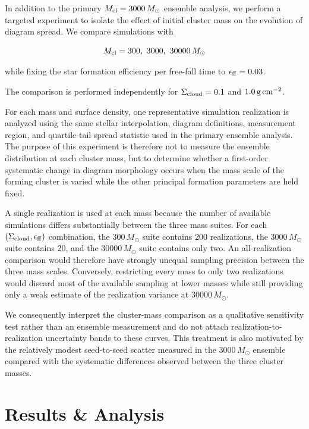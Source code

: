 \documentclass[linenumbers, twocolumn]{aastex631}
\begin{document}
In addition to the primary $M_{\rm cl}=3000\,M_\odot$ ensemble analysis, we perform a targeted experiment to isolate the effect of initial cluster mass on the evolution of diagram spread. We compare simulations with

\begin{equation}
    M_{\rm cl} = 300,\ 3000,\ 30000\,M_\odot
\end{equation}

while fixing the star formation efficiency per free-fall time to $\epsilon_{\rm ff}=0.03$.

The comparison is performed independently for $\Sigma_{\rm cloud}=0.1$ and $1.0\,{\rm g\,cm^{-2}}$.

For each mass and surface density, one representative simulation realization is analyzed using the same stellar interpolation, diagram definitions, measurement region, and quartile-tail spread statistic used in the primary ensemble analysis. The purpose of this experiment is therefore not to measure the ensemble distribution at each cluster mass, but to determine whether a first-order systematic change in diagram morphology occurs when the mass scale of the forming cluster is varied while the other principal formation parameters are held fixed.

A single realization is used at each mass because the number of available simulations differs substantially between the three mass suites. For each $(\Sigma_{\rm cloud},\epsilon_{\rm ff})$ combination, the $300\,M_\odot$ suite contains 200 realizations, the $3000\,M_\odot$ suite contains 20, and the $30000\,M_\odot$ suite contains only two. An all-realization comparison would therefore have strongly unequal sampling precision between the three mass scales. Conversely, restricting every mass to only two realizations would discard most of the available sampling at lower masses while still providing only a weak estimate of the realization variance at $30000\,M_\odot$.

We consequently interpret the cluster-mass comparison as a qualitative sensitivity test rather than an ensemble measurement and do not attach realization-to-realization uncertainty bands to these curves. This treatment is also motivated by the relatively modest seed-to-seed scatter measured in the $3000\,M_\odot$ ensemble compared with the systematic differences observed between the three cluster masses.





\section{Results \& Analysis} \label{sec:results}
\end{document}
